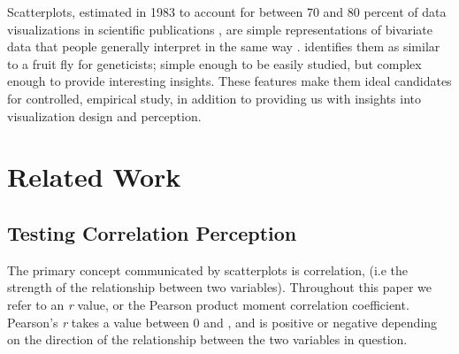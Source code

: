 \documentclass[preprint, 3p,
authoryear]{elsarticle} %
\begin{document}
Scatterplots, estimated in 1983 to account for between 70 and 80 percent
of data visualizations in scientific publications \citep{tufte_1983},
are simple representations of bivariate data that people generally
interpret in the same way \citep{kay_heer_2015}. \citet{rensink_2014}
identifies them as similar to a fruit fly for geneticists; simple enough
to be easily studied, but complex enough to provide interesting
insights. These features make them ideal candidates for controlled,
empirical study, in addition to providing us with insights into
visualization design and perception.

\hypertarget{related-work}{%
\section{Related Work}\label{related-work}}

\hypertarget{testing-correlation-perception}{%
\subsection{Testing Correlation
Perception}\label{testing-correlation-perception}}

The primary concept communicated by scatterplots is correlation, (i.e
the strength of the relationship between two variables). Throughout this
paper we refer to an \emph{r} value, or the Pearson product moment
correlation coefficient. Pearson's \emph{r} takes a value between 0 and
\textbar, and is positive or negative depending on the
direction of the relationship between the two variables in question.
\end{document}
